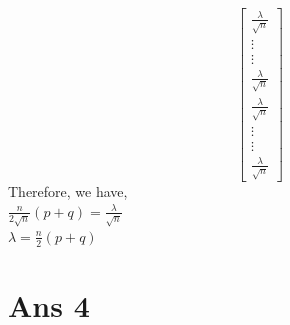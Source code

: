\documentclass[10pt]{article}
\begin{document}
\begin{flushleft}
$$\begin{bmatrix}
\frac{\lambda}{\sqrt n}\\
\vdots\\
\vdots\\
\frac{\lambda}{\sqrt n}\\
\frac{\lambda}{\sqrt n}\\
\vdots\\
\vdots\\
\frac{\lambda}{\sqrt n}
\end{bmatrix}
$$
Therefore, we have,\\
\vspace{0.5em}
$\frac{n}{2 \sqrt n} (p+q) = \frac{\lambda}{\sqrt n}$\\
\vspace{0.5em}
$\lambda = \frac{n}{2} (p+q)$
\end{flushleft}
\section*{Ans 4}
\end{document}
